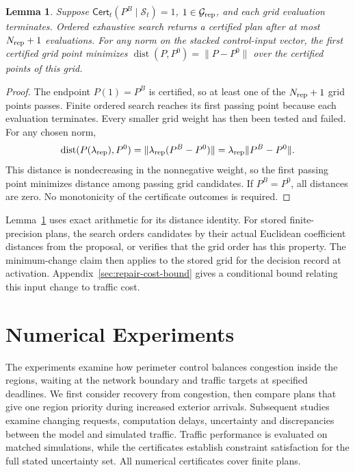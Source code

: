 \documentclass[final]{cas-sc}
\theoremstyle{definition}
\theoremstyle{plain}
\newtheorem{lemma}{Lemma}
\theoremstyle{definition}
\theoremstyle{plain}
\newcommand{\appref}[1]{Appendix~\ref{#1}}
\begin{document}
\begin{lemma}
\label{thm:repair-grid}
Suppose $\mathsf{Cert}_t(P^{B}\mid\mathcal S_t)=1$,
$1\in\mathcal G_{\rm rep}$, and each grid evaluation terminates.
Ordered exhaustive search returns a certified plan after at most
$N_{\rm rep}+1$ evaluations. For any norm on the stacked control-input
vector, the first certified grid point minimizes
$\operatorname{dist}(P,P^{0})=\|P-P^{0}\|$ over the certified points of
this grid.
\end{lemma}

\begin{proof}
The endpoint $P(1)=P^{B}$ is certified, so at least one of the
$N_{\rm rep}+1$ grid points passes. Finite ordered search reaches its
first passing point because each evaluation terminates. Every smaller
grid weight has then been tested and failed. For any chosen norm,
\[
\operatorname{dist}(P(\lambda_{\rm rep}),P^{0})
=\|\lambda_{\rm rep}(P^{B}-P^{0})\|
=\lambda_{\rm rep}\|P^{B}-P^{0}\|.
\]
This distance is nondecreasing in the nonnegative weight, so the first
passing point minimizes distance among passing grid candidates. If
$P^{B}=P^{0}$, all distances are zero. No monotonicity of the
certificate outcomes is required.
\end{proof}

Lemma~\ref{thm:repair-grid} uses exact arithmetic for its distance identity.
For stored finite-precision plans, the search orders candidates by
their actual Euclidean coefficient distances from the proposal, or
verifies that the grid order has this property. The minimum-change
claim then applies to the stored grid for the decision record at
activation. \appref{sec:repair-cost-bound} gives a conditional bound relating
this input change to traffic cost.

\section{Numerical Experiments}
\label{sec:new-evidence}

The experiments examine how perimeter control balances congestion inside
the regions, waiting at the network boundary and traffic targets at
specified deadlines. We first consider recovery from congestion, then
compare plans that give one region priority during increased exterior
arrivals. Subsequent studies examine changing requests, computation
delays, uncertainty and discrepancies between the model and simulated
traffic. Traffic performance is evaluated on matched simulations, while
the certificates establish constraint satisfaction for the full stated
uncertainty set. All numerical certificates cover finite plans.
\end{document}
